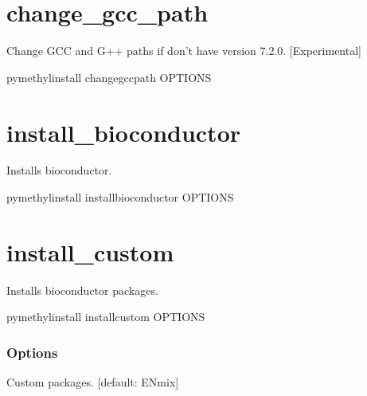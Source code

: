 \documentclass[letterpaper,10pt,english]{sphinxmanual}
\begin{document}
\section{change\_gcc\_path}
\label{\detokenize{index:pymethyl-install-change-gcc-path}}
Change GCC and G++ paths if don’t have version 7.2.0. {[}Experimental{]}

\begin{sphinxVerbatim}[commandchars=\\\{\}]
pymethyl\PYGZhy{}install change\PYGZus{}gcc\PYGZus{}path \PYG{o}{[}OPTIONS\PYG{o}{]}
\end{sphinxVerbatim}


\section{install\_bioconductor}
\label{\detokenize{index:pymethyl-install-install-bioconductor}}
Installs bioconductor.

\begin{sphinxVerbatim}[commandchars=\\\{\}]
pymethyl\PYGZhy{}install install\PYGZus{}bioconductor \PYG{o}{[}OPTIONS\PYG{o}{]}
\end{sphinxVerbatim}


\section{install\_custom}
\label{\detokenize{index:pymethyl-install-install-custom}}
Installs bioconductor packages.

\begin{sphinxVerbatim}[commandchars=\\\{\}]
pymethyl\PYGZhy{}install install\PYGZus{}custom \PYG{o}{[}OPTIONS\PYG{o}{]}
\end{sphinxVerbatim}
\subsubsection*{Options}

\begin{fulllineitems}
\label{\detokenize{index:cmdoption-pymethyl-install-install-custom-p}}
Custom packages.  {[}default: ENmix{]}

\end{fulllineitems}
\end{document}
